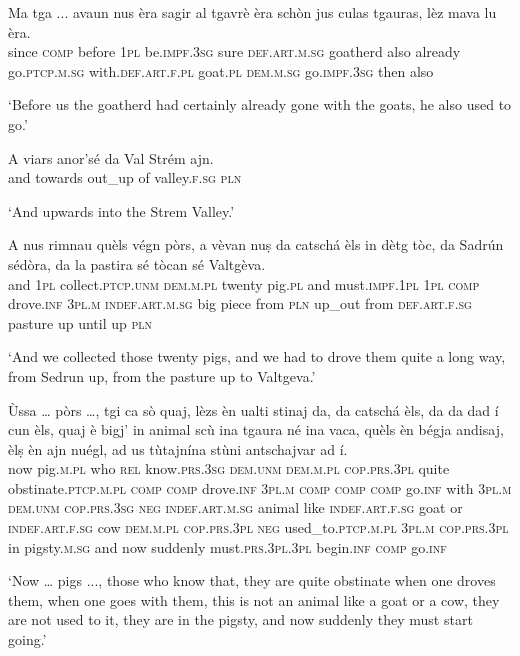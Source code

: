 \begin{linenumbers}
	\gll  Ma tga ... avaun nus èra sagir al tgavrè èra schòn jus culas tgauras, lèz mava lu èra.\\
	since \textsc{comp} {} before \textsc{1pl} be.\textsc{impf.3sg} sure \textsc{def.art.m.sg} goatherd also already go.\textsc{ptcp.m.sg} with.\textsc{def.art.f.pl} goat.\textsc{pl} \textsc{dem.m.sg} go.\textsc{impf.3sg} then also\\
\end{linenumbers}
\medskip
\glt `Before us the goatherd had certainly already gone with the goats, he also used to go.'
\medskip

\begin{linenumbers}
	\gll    A viars anor’sé da Val Strém ajn.\\
	and towards out\_up of valley.\textsc{f.sg} \textsc{pln}\\
\end{linenumbers}
\medskip
\glt `And upwards into the Strem Valley.'
\medskip

\begin{linenumbers}
	\gll    A nus rimnau quèls végn pòrs, a vèvan nuṣ da catschá èls in dètg tòc, da Sadrún sédòra, da la pastira sé tòcan sé Valtgèva.\\
	and \textsc{1pl} collect.\textsc{ptcp.unm}  \textsc{dem.m.pl} twenty pig.\textsc{pl} and must.\textsc{impf.1pl} \textsc{1pl} \textsc{comp} drove.\textsc{inf} \textsc{3pl.m} \textsc{indef.art.m.sg} big piece from \textsc{pln} up\_out from \textsc{def.art.f.sg}  pasture up until up \textsc{pln}\\
\end{linenumbers}
\medskip
\glt `And we collected those twenty pigs, and we had to drove them quite a long way, from Sedrun up, from the pasture up to Valtgeva.'
\medskip

\begin{linenumbers}
	\gll    Ùssa … pòrs …, tgi ca sò quaj, lèzs èn ualti stinaj da, da catschá èls, da da dad í cun èls, quaj è bigj’ in animal scù ina tgaura né ina vaca, quèls èn bégja andisaj, èlṣ èn ajn nuégl, ad us tùtajnína stùni antschajvar ad í.\\
	now {} pig.\textsc{m.pl} {} who \textsc{rel}  know.\textsc{prs.3sg} \textsc{dem.unm} \textsc{dem.m.pl} \textsc{cop.prs.3pl} quite obstinate.\textsc{ptcp.m.pl} \textsc{comp} \textsc{comp} drove.\textsc{inf} \textsc{3pl.m} \textsc{comp} \textsc{comp} \textsc{comp} go.\textsc{inf} with \textsc{3pl.m} \textsc{dem.unm} \textsc{cop.prs.3sg} \textsc{neg} \textsc{indef.art.m.sg} animal like \textsc{indef.art.f.sg} goat or \textsc{indef.art.f.sg} cow  \textsc{dem.m.pl} \textsc{cop.prs.3pl} \textsc{neg} used\_to.\textsc{ptcp.m.pl} \textsc{3pl.m} \textsc{cop.prs.3pl} in pigsty.\textsc{m.sg} and now suddenly must.\textsc{prs.3pl.3pl} begin.\textsc{inf} \textsc{comp} go.\textsc{inf}\\
\end{linenumbers}
\medskip
\glt `Now … pigs ..., those who know that, they are quite obstinate when one droves them, when one goes with them, this is not an animal like a goat or a cow, they are not used to it, they are in the pigsty, and now suddenly they must start going.'
\medskip

